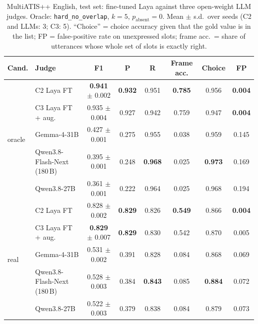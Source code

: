 \begin{table}[pos=t]
\centering
\small
\caption{MultiATIS++ English, test set: fine-tuned Laya against three open-weight LLM judges. Oracle: \texttt{hard\_no\_overlap}, $k=5$, $p_{\text{absent}}=0$. Mean $\pm$ s.d.\ over seeds (C2 and LLMs: 3; C3: 5). ``Choice'' = choice accuracy given that the gold value is in the list; FP = false-positive rate on unexpressed slots; frame acc.\ = share of utterances whose whole set of slots is exactly right.}
\label{tab:rq1-atis}
\setlength{\tabcolsep}{4pt}
\begin{tabular}{@{}llcccccc@{}}
\toprule
Cand. & Judge & F1 & P & R & Frame acc. & Choice & FP \\
\midrule
\multirow{5}{*}{oracle}
 & C2 Laya FT & \textbf{0.941} $\pm$ 0.002 & \textbf{0.932} & 0.951 & \textbf{0.785} & 0.956 & \textbf{0.004} \\
 & C3 Laya FT + aug. & 0.935 $\pm$ 0.004 & 0.927 & 0.942 & 0.759 & 0.947 & \textbf{0.004} \\
 & Gemma-4-31B & 0.427 $\pm$ 0.001 & 0.275 & 0.955 & 0.038 & 0.959 & 0.145 \\
 & Qwen3.8-Flash-Next (180\,B) & 0.395 $\pm$ 0.001 & 0.248 & \textbf{0.968} & 0.025 & \textbf{0.973} & 0.169 \\
 & Qwen3.8-27B & 0.361 $\pm$ 0.001 & 0.222 & 0.964 & 0.025 & 0.968 & 0.194 \\
\midrule
\multirow{5}{*}{real}
 & C2 Laya FT & 0.828 $\pm$ 0.002 & \textbf{0.829} & 0.826 & \textbf{0.549} & 0.866 & \textbf{0.004} \\
 & C3 Laya FT + aug. & \textbf{0.829} $\pm$ 0.007 & \textbf{0.829} & 0.830 & 0.542 & 0.870 & 0.005 \\
 & Gemma-4-31B & 0.531 $\pm$ 0.002 & 0.391 & 0.828 & 0.084 & 0.868 & 0.069 \\
 & Qwen3.8-Flash-Next (180\,B) & 0.528 $\pm$ 0.003 & 0.384 & \textbf{0.843} & 0.085 & \textbf{0.884} & 0.072 \\
 & Qwen3.8-27B & 0.522 $\pm$ 0.003 & 0.379 & 0.838 & 0.084 & 0.879 & 0.073 \\
\bottomrule
\end{tabular}
\end{table}

